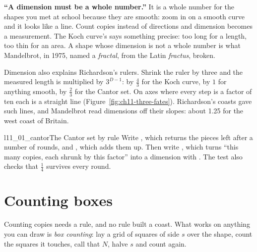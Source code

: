 \begin{trapbox}
\textbf{\enquote{A dimension must be a whole number.}} It is a whole number
for the shapes you met at school because they are smooth: zoom in on a
smooth curve and it looks like a line. Count copies instead of directions
and dimension becomes a measurement. The Koch curve's 
says something precise: too long for a length, too thin for an area. A shape whose dimension is not a whole
number is what Mandelbrot, in 1975, named a \emph{fractal}, from the Latin
\emph{fractus}, broken.
\end{trapbox}

\noindent
Dimension also explains Richardson's rulers. Shrink the ruler by three and
the measured length is multiplied by $3^{D - 1}$: by $\tfrac{4}{3}$ for the
Koch curve, by $1$ for anything smooth, by $\tfrac{2}{3}$ for the Cantor set.
On axes where every step is a factor of ten each is a straight line
(Figure~\ref{fig:ch11-three-fates}). Richardson's coasts gave such lines,
and Mandelbrot read dimensions off their slopes: about \num{1.25} for the
west coast of Britain.


\begin{lab}{l11_01_cantor}{The Cantor set by rule}
Write , which returns the pieces left after a number of rounds,
and , which adds them up. Then write
, which turns \enquote{this many copies, each
shrunk by this factor} into a dimension with . The test also
checks that $\tfrac{1}{4}$ survives every round.
\end{lab}

\section{Counting boxes}
\label{sec:ch11-boxes}

\noindent
Counting copies needs a rule, and no rule built a coast. What works on
anything you can draw is \emph{box counting}: lay a grid of squares of side
$s$ over the shape, count the squares it touches, call that $N$, halve $s$
and count again.

